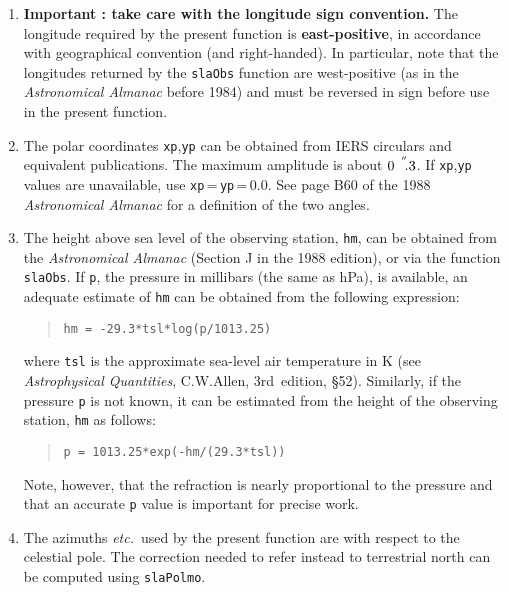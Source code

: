 \documentclass[11pt,fleqn,twoside]{article}
\renewcommand{\_}{{\tt\char'137}}     %
\newcommand{\arcseci}[1] {$#1\hspace{0.05em}$\raisebox{-0.5ex}
                         {$^{'\hspace{-0.1em}'\hspace{0.0em}}$}}
\newcommand{\arcsec}[2] {\arcseci{#1}$\hspace{-0.35em}.#2$}
\newcommand{\tseci}[1]   {$#1$\mbox{$^{\rm s}$}}
\newcommand{\tsec}[2]    {\tseci{#1}$\hspace{-0.3em}.#2$}
\begin{document}
{\begin{enumerate}
        elsewhere.  It increases by exactly one second at the end of
        each UTC leap second, introduced in order to keep $\Delta$UT
        within $\pm$\tsec{0}{9}.
  \item {\bf Important : take care with the longitude sign convention.}  The
        longitude required by the present function is {\bf east-positive},
        in accordance with geographical convention (and right-handed).
        In particular, note that the longitudes returned by the
        {\tt slaObs} function are west-positive (as in the {\it Astronomical
        Almanac}\/ before 1984) and must be reversed in sign before use
        in the present function.
  \item The polar coordinates {\tt xp},{\tt yp} can be obtained from IERS
        circulars and equivalent publications.  The
        maximum amplitude is about \arcsec{0}{3}.  If
        {\tt xp},{\tt yp} values
        are unavailable, use {\tt xp}\,=\,{\tt yp}\,=\,0.0.
        See page B60 of the 1988
        {\it Astronomical Almanac}\/ for a definition of the two angles.
  \item The height above sea level of the observing
        station, {\tt hm},
        can be obtained from the {\it Astronomical Almanac}\/ (Section J
        in the 1988 edition), or via the function {\tt slaObs}.
        If {\tt p}, the pressure in millibars (the same as hPa),
        is available, an adequate
        estimate of {\tt hm} can be obtained from the following expression:
        \begin{quote}
         {\tt hm = -29.3*tsl*log(p/1013.25)}
        \end{quote}
        where {\tt tsl} is the approximate sea-level air temperature in K
        (see {\it Astrophysical Quantities}, C.W.Allen, 3rd~edition,
        \S 52).  Similarly, if the pressure {\tt p} is not known,
        it can be estimated from the height of the observing
        station, {\tt hm} as follows:
        \begin{quote}
         {\tt p = 1013.25*exp(-hm/(29.3*tsl))}
        \end{quote}
        Note, however, that the refraction is nearly proportional to the
        pressure and that an accurate {\tt p} value is important for
        precise work.
  \item The azimuths {\it etc.}\ used by the present function are with
        respect to the celestial pole.
        The correction needed to refer instead to terrestrial north
        can be computed using {\tt slaPolmo}.
 \end{enumerate}
}
\end{document}
